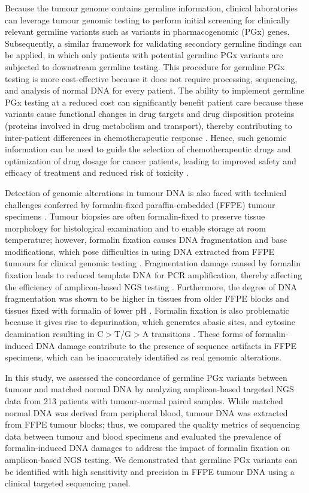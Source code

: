 \documentclass{bmcart}
\begin{document}
Because the tumour genome contains germline information, clinical laboratories can leverage tumour genomic testing to perform initial screening for clinically relevant germline variants such as variants in pharmacogenomic (PGx) genes. Subsequently, a similar framework for validating secondary germline findings can be applied, in which only patients with potential germline PGx variants are subjected to downstream germline testing. This procedure for germline PGx testing is more cost-effective because it does not require processing, sequencing, and analysis of normal DNA for every patient. The ability to implement germline PGx testing at a reduced cost can significantly benefit patient care because these variants cause functional changes in drug targets and drug disposition proteins (proteins involved in drug metabolism and transport), thereby contributing to inter-patient differences in chemotherapeutic response \cite{McLeod2013}. Hence, such genomic information can be used to guide the selection of chemotherapeutic drugs and optimization of drug dosage for cancer patients, leading to improved safety and efficacy of treatment and reduced risk of toxicity \cite{McLeod2013}.

Detection of genomic alterations in tumour DNA is also faced with technical challenges conferred by formalin-fixed paraffin-embedded (FFPE) tumour specimens \cite{Do2015,Wong2014}. Tumour biopsies are often formalin-fixed to preserve tissue morphology for histological examination and to enable storage at room temperature; however, formalin fixation causes DNA fragmentation and base modifications, which pose difficulties in using DNA extracted from FFPE tumours for clinical genomic testing \cite{Do2015,Wong2014}. Fragmentation damage caused by formalin fixation leads to reduced template DNA for PCR amplification, thereby affecting the efficiency of amplicon-based NGS testing \cite{Do2015,Wong2014}. Furthermore, the degree of DNA fragmentation was shown to be higher in tissues from older FFPE blocks and tissues fixed with formalin of lower pH \cite{Do2015}. Formalin fixation is also problematic because it gives rise to depurination, which generates abasic sites, and cytosine deamination resulting in C$>$T/G$>$A transitions \cite{Do2015}. These forms of formalin-induced DNA damage contribute to the presence of sequence artifacts in FFPE specimens, which can be inaccurately identified as real genomic alterations.

In this study, we assessed the concordance of germline PGx variants between tumour and matched normal DNA by analyzing amplicon-based targeted NGS data from 213 patients with tumour-normal paired samples. While matched normal DNA was derived from peripheral blood, tumour DNA was extracted from FFPE tumour blocks; thus, we compared the quality metrics of sequencing data between tumour and blood specimens and evaluated the prevalence of formalin-induced DNA damages to address the impact of formalin fixation on amplicon-based NGS testing. We demonstrated that germline PGx variants can be identified with high sensitivity and precision in FFPE tumour DNA using a clinical targeted sequencing panel.
\end{document}
